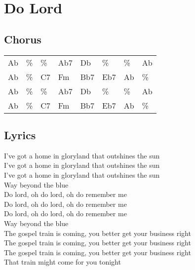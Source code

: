 \section{Do Lord}


\subsection*{Chorus}


\begin{tabular}{l l l l l l l l}
Ab & \% & \% & Ab7 & Db & \% & \% & Ab \\ 
Ab & \% & C7 & Fm & Bb7 & Eb7 & Ab & \% \\ 
Ab & \% & \% & Ab7 & Db & \% & \% & Ab \\ 
Ab & \% & C7 & Fm & Bb7 & Eb7 & Ab & \% \\ 
\end{tabular}


\subsection*{Lyrics}


I've got a home in gloryland that outshines the sun \\ 
I've got a home in gloryland that outshines the sun \\ 
I've got a home in gloryland that outshines the sun \\ 
Way beyond the blue \\ 

Do lord, oh do lord, oh do remember me \\ 
Do lord, oh do lord, oh do remember me \\ 
Do lord, oh do lord, oh do remember me \\ 
Way beyond the blue \\ 

The gospel train is coming, you better get your business right \\ 
The gospel train is coming, you better get your business right \\ 
The gospel train is coming, you better get your business right \\ 
That train might come for you tonight \\ 
